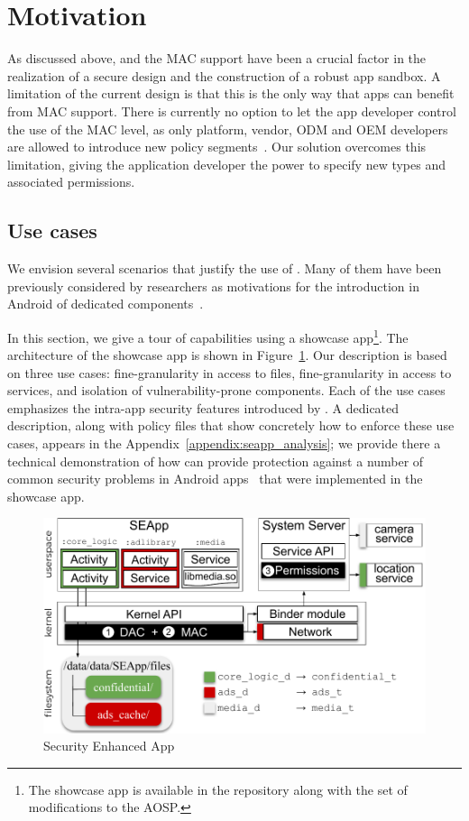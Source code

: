 \section{Motivation}\label{sect:seapp_motiv}

As discussed above, \sel and the MAC support have been a crucial
factor in the realization of a secure design and the construction of a
robust app sandbox.  A limitation of the current design is that this
is the only way that apps can benefit from MAC support.  There is
currently no option to let the app developer control the use of the
MAC level, as only platform, vendor, ODM and OEM developers are
allowed to introduce new policy
segments~\cite{seapp_sea_compatibility}.  Our solution overcomes this
limitation, giving the application developer the power to specify new
\sel types and associated permissions.

\subsection{Use cases}\label{sect:seapp_use-cases}
We envision several scenarios that justify the use of \seapp.  Many of
them have been previously considered by researchers as motivations for
the introduction in Android of dedicated
components~\cite{seapp_10.1145/2976749.2978333,
  seapp_10.1145/3292006.3300027, seapp_10.1145/3133956.3134064}.

In this section, we give a tour of \seapp capabilities using a showcase
app\footnote{The showcase app is available in the \seapp repository
  along with the set of modifications to the AOSP.}.  The architecture
of the showcase app is shown in Figure~\ref{fig:seapp_showcase}. Our
description is based on three use cases: fine-granularity in access to
files, fine-granularity in access to services, and isolation of
vulnerability-prone components.  Each of the use cases emphasizes the
intra-app security features introduced by \seapp.  A dedicated
description, along with policy files that show concretely how to
enforce these use cases, appears in the
Appendix~\ref{appendix:seapp_analysis}; we provide there a technical
demonstration of how \seapp can provide protection against a number of
common security problems in Android
apps~\cite{seapp_common_play_protect_vulnerabilites} that were
implemented in the showcase app.

\begin{figure}[h]
	\centering
	\includegraphics[width=0.8\columnwidth]{chapters/seapp/figs/seapp_showcase_app}
	\caption{\label{fig:seapp_showcase} Security Enhanced App}
\end{figure}

